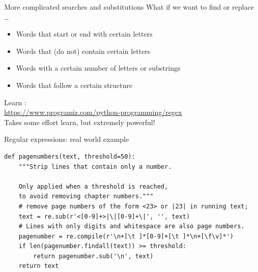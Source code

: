 \documentclass[aspectratio=169,usenames,dvipsnames]{beamer}
\begin{document}
% 
% 
% 

\begin{frame}{More complicated searches and substitutions}
What if we want to find or replace \dots
\begin{itemize}
    \item Words that start or end with certain letters
    \item Words that (do not) contain certain letters
    \item Words with a certain number of letters or substrings
    \item Words that follow a certain structure
\end{itemize}

Learn :\\
\url{https://www.programiz.com/python-programming/regex} \\

\vspace{1em}
Takes some effort learn, but extremely powerful!
\end{frame}

\begin{frame}[fragile]{Regular expressions: real world example}
\begin{lstlisting}
def pagenumbers(text, threshold=50):
    """Strip lines that contain only a number.

    Only applied when a threshold is reached,
    to avoid removing chapter numbers."""
    # remove page numbers of the form <23> or |23| in running text;
    text = re.sub(r'<[0-9]+>|\|[0-9]+\|', '', text)
    # Lines with only digits and whitespace are also page numbers.
    pagenumber = re.compile(r'\n+[\t ]*[0-9]+[\t ]*\n+[\f\v]*')
    if len(pagenumber.findall(text)) >= threshold:
        return pagenumber.sub('\n', text)
    return text
\end{lstlisting}
\end{frame}
\end{document}
